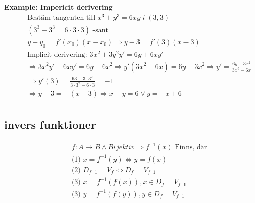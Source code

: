 \documentclass{article}
\begin{document}
\textbf{Example: Impericit derivering}
\begin{align*}
  &\quad  \text{Bestäm tangenten till } x^3+y^3=6xy \; i \; (3,3) \\
  &\quad  (3^3+3^3=6\cdot3\cdot3) \text{ -sant} \\
  &\quad  y-y_0=f'(x_0)(x-x_0) \Rightarrow y-3=f'(3)(x-3) \\
  &\quad  \text{Implicit derivering: } 3x^2+3y^2y'=6y+6xy' \\
  &\quad  \Rightarrow 3x^2y'-6xy'=6y-6x^2
  \Rightarrow y'(3x^2-6x)=6y-3x^2
  \Rightarrow y'=\frac{6y-3x^2}{3x^2-6x} \\
  &\quad \Rightarrow y'(3)=\frac{63-3\cdot3^2}{3\cdot3^2-6\cdot3}=-1 \\
  &\quad \Rightarrow y-3=-(x-3) \Rightarrow x+y=6 \lor y=-x+6 \\
\end{align*}


\subsection{invers funktioner} 
\begin{align*}
  &\quad  f: A \to B \land Bijektiv \Rightarrow f^{-1}(x) \text{ Finns, där}  \\
  &\quad \text{(1) }  x = f^{-1}(y) \Leftrightarrow y = f(x) \\
  &\quad \text{(2) }  D_{f^-1} = V_f \Leftrightarrow D_f = V_{f^-1} \\
  &\quad \text{(3) }  x = f^{-1}(f(x)), x \in D_f = V_{f^-1} \\ 
  &\quad \text{(3) }  y = f^{-1}(f(y)), y \in D_f = V_{f^-1} \\ 
\end{align*}

\end{document}
